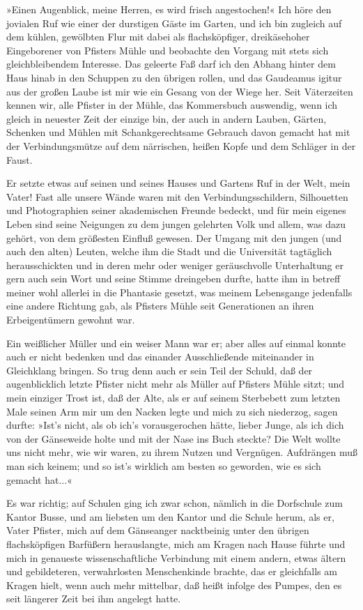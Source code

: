 »Einen Augenblick, meine Herren, es wird frisch angestochen!« Ich
höre den jovialen Ruf wie einer der durstigen Gäste im Garten, und
ich bin zugleich auf dem kühlen, gewölbten Flur mit dabei als
flachsköpfiger, dreikäsehoher Eingeborener von Pfisters Mühle und
beobachte den Vorgang mit stets sich gleichbleibendem Interesse.
Das geleerte Faß darf ich den Abhang hinter dem Haus hinab in den
Schuppen zu den übrigen rollen, und das Gaudeamus igitur aus der
großen Laube ist mir wie ein Gesang von der Wiege her. Seit
Väterzeiten kennen wir, alle Pfister in der Mühle, das Kommersbuch
auswendig, wenn ich gleich in neuester Zeit der einzige bin, der
auch in andern Lauben, Gärten, Schenken und Mühlen mit
Schankgerechtsame Gebrauch davon gemacht hat mit der
Verbindungsmütze auf dem närrischen, heißen Kopfe und dem Schläger
in der Faust.

Er setzte etwas auf seinen und seines Hauses und Gartens Ruf in der
Welt, mein Vater! Fast alle unsere Wände waren mit den
Verbindungsschildern, Silhouetten und Photographien seiner
akademischen Freunde bedeckt, und für mein eigenes Leben sind seine
Neigungen zu dem jungen gelehrten Volk und allem, was dazu gehört,
von dem größesten Einfluß gewesen. Der Umgang mit den jungen (und
auch den alten) Leuten, welche ihm die Stadt und die Universität
tagtäglich herausschickten und in deren mehr oder weniger
geräuschvolle Unterhaltung er gern auch sein Wort und seine Stimme
dreingeben durfte, hatte ihm in betreff meiner wohl allerlei in die
Phantasie gesetzt, was meinem Lebensgange jedenfalls eine andere
Richtung gab, als Pfisters Mühle seit Generationen an ihren
Erbeigentümern gewohnt war.

Ein weißlicher Müller und ein weiser Mann war er; aber alles auf
einmal konnte auch er nicht bedenken und das einander
Ausschließende miteinander in Gleichklang bringen. So trug denn
auch er sein Teil der Schuld, daß der augenblicklich letzte Pfister
nicht mehr als Müller auf Pfisters Mühle sitzt; und mein einziger
Trost ist, daß der Alte, als er auf seinem Sterbebett zum letzten
Male seinen Arm mir um den Nacken legte und mich zu sich niederzog,
sagen durfte: »Ist's nicht, als ob ich's vorausgerochen hätte,
lieber Junge, als ich dich von der Gänseweide holte und mit der
Nase ins Buch steckte? Die Welt wollte uns nicht mehr, wie wir
waren, zu ihrem Nutzen und Vergnügen. Aufdrängen muß man sich
keinem; und so ist's wirklich am besten so geworden, wie es sich
gemacht hat...«

Es war richtig; auf Schulen ging ich zwar schon, nämlich in die
Dorfschule zum Kantor Busse, und am liebsten um den Kantor und die
Schule herum, als er, Vater Pfister, mich auf dem Gänseanger
nacktbeinig unter den übrigen flachsköpfigen Barfüßern
herauslangte, mich am Kragen nach Hause führte und mich in
genaueste wissenschaftliche Verbindung mit einem andern, etwas
ältern und gebildeteren, verwahrlosten Menschenkinde brachte, das
er gleichfalls am Kragen hielt, wenn auch mehr mittelbar, daß heißt
infolge des Pumpes, den es seit längerer Zeit bei ihm angelegt
hatte.

